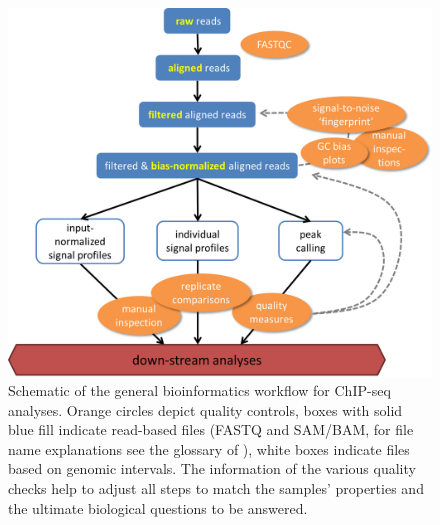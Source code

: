 \begin{figure}
 \begin{minipage}[c]{0.6\textwidth}
   \includegraphics[width=\textwidth]{Figures/workflowChIP-seq.png}
 \end{minipage}\hfill
 \begin{minipage}[c]{0.35\textwidth}
	\begin{footnotesize}
   \caption[General bioinformatics workflow for ChIP-seq analyses.]{\textsf{Schematic of the general bioinformatics workflow for ChIP-seq analyses.
	Orange circles depict quality controls, boxes with solid blue fill indicate read-based files (FASTQ and SAM/BAM, for file name explanations see the glossary of ), white boxes indicate files based on genomic intervals. The in\-for\-ma\-tion of the various quality checks help to adjust all steps to match the samples' properties and the ultimate biological questions to be answered.
}}
\label{fig:workflow}
\end{footnotesize}
 \end{minipage}
\end{figure}
%
%
%
